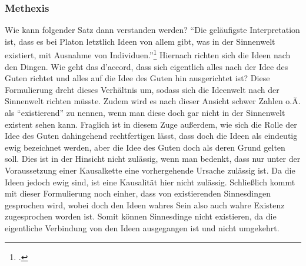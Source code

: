 \subsubsection{Methexis}
Wie kann folgender Satz dann verstanden werden? \enquote{Die geläufigste Interpretation ist, dass es bei Platon letztlich Ideen von allem gibt, was in der Sinnenwelt existiert, mit Ausnahme von Individuen.}\footcite[][S. 31]{DisseMetaphysik} 
Hiernach richten sich die Ideen nach den Dingen. Wie geht das d'accord, dass sich eigentlich alles nach der Idee des Guten richtet und alles auf die Idee des Guten hin ausgerichtet ist? Diese Formulierung dreht dieses Verhältnis um, sodass sich die Ideenwelt nach der Sinnenwelt richten müsste. Zudem wird es nach dieser Ansicht schwer Zahlen o.Ä. als \enquote{existierend} zu nennen, wenn man diese doch gar nicht in der Sinnenwelt existent sehen kann. 
Fraglich ist in diesem Zuge außerdem, wie sich die Rolle der Idee des Guten dahingehend rechtfertigen lässt, dass doch die Ideen als eindeutig ewig bezeichnet werden, aber die Idee des Guten doch als deren Grund gelten soll. Dies ist in der Hinsicht nicht zulässig, wenn man bedenkt, dass nur unter der Voraussetzung einer Kausalkette eine vorhergehende Ursache zulässig ist. Da die Ideen jedoch ewig sind, ist eine Kausalität hier nicht zulässig.
Schließlich kommt mit dieser Formulierung noch einher, dass von existierenden Sinnesdingen gesprochen wird, wobei doch den Ideen wahres Sein also auch wahre Existenz zugesprochen worden ist. Somit können Sinnesdinge nicht existieren, da die eigentliche Verbindung von den Ideen ausgegangen ist und nicht umgekehrt.
